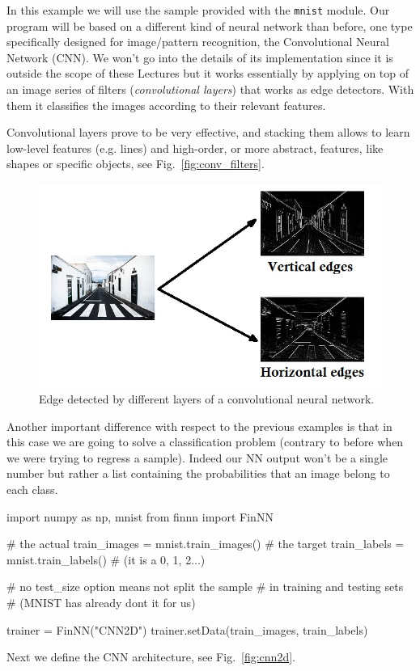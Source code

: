 In this example we will use the sample provided with the \texttt{mnist} module. 
Our program will be based on a different kind of neural network than before, one type specifically designed for image/pattern recognition, the Convolutional Neural Network (CNN). We won't go into the details of its implementation since it is outside the scope of these Lectures but it works essentially by applying on top of an image series of filters (\emph{convolutional layers}) that works as edge detectors. With them it classifies the images according to their relevant features.

Convolutional layers prove to be very effective, and stacking them allows to learn low-level features (e.g. lines) and high-order, or more abstract, features, like shapes or specific objects, see Fig.~\ref{fig:conv_filters}.

\begin{figure}[htb]
	\centering
	\includegraphics[width=1.\textwidth]{figures/edges.jpg}
	\caption{Edge detected by different layers of a convolutional neural network.}
        \label{fig:conv_fitlers}
\end{figure}

Another important difference with respect to the previous examples is that in this case we are going to solve a classification problem (contrary to before when we were trying to regress a sample). Indeed our NN output won't be a single number but rather a list containing the probabilities that an image belong to each class.

\begin{ipython}
import numpy as np, mnist
from finnn import FinNN

# the actual
train_images = mnist.train_images()
# the target
train_labels = mnist.train_labels() # (it is a 0, 1, 2...)

# no test_size option means not split the sample
# in training and testing sets
# (MNIST has already dont it for us)

trainer = FinNN("CNN2D")
trainer.setData(train_images, train_labels)
\end{ipython}
\noindent
Next we define the CNN architecture, see Fig.~\ref{fig:cnn2d}.

